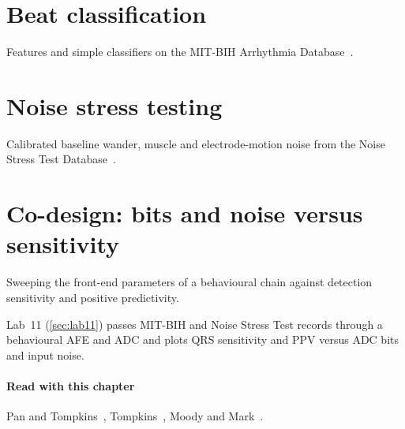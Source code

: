 \section{Beat classification}\label{sec:ch24-3}
Features and simple classifiers on the MIT-BIH Arrhythmia Database~\cite{mitbih}.

\section{Noise stress testing}\label{sec:ch24-4}
Calibrated baseline wander, muscle and electrode-motion noise from the Noise Stress Test Database~\cite{nstdb}.

\section{Co-design: bits and noise versus sensitivity}\label{sec:ch24-5}
Sweeping the front-end parameters of a behavioural chain against detection sensitivity and positive predictivity.

\begin{tryit}
Lab~11 (\cref{sec:lab11}) passes MIT-BIH and Noise Stress Test records through a behavioural AFE and ADC and plots QRS sensitivity and PPV versus ADC bits and input noise.
\end{tryit}

\paragraph{Read with this chapter} Pan and Tompkins~\cite{pantompkins1985}, Tompkins~\cite{tompkins}, Moody and Mark~\cite{mitbih}.
